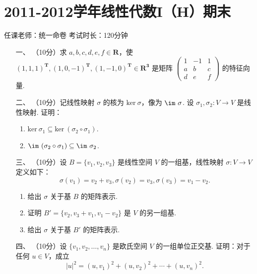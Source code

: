 \section*{2011-2012学年线性代数I（H）期末}

\begin{center}
    任课老师：统一命卷\hspace{4em} 考试时长：120分钟
\end{center}

\begin{enumerate}
    \item [一、]（10分）求 $a,b,c,d,e,f\in \mathbf{R}$，使 $(1,1,1)^\mathbf{T},(1,0,-1)^\mathbf{T},(1,-1,0)^\mathbf{T}\in \mathbf{R^3}$ 是矩阵 $\begin{pmatrix}1 & -1 & 1 \\ a & b & c \\ d & e & f\end{pmatrix}$ 的特征向量.

    \item [二、]（10分）记线性映射 $\sigma$ 的核为 $\mathrm{ker}\ \sigma$，像为 $\im\ \sigma$.  设 $\sigma_1,\sigma_2:V\to V$ 是线性映射. 证明：
    \begin{enumerate}[label=(\arabic*)]
        \item $\mathrm{ker}\ \sigma_1 \subseteq \mathrm{ker}\ (\sigma_2 \circ \sigma_1)$.

        \item $\im\ (\sigma_2 \circ \sigma_1) \subseteq \im\ \sigma_2$.
    \end{enumerate}

\item [三、]（10分）设 $B=\{v_1,v_2,v_3\}$ 是线性空间 $V$ 的一组基，线性映射 $\sigma:V\to V$ 定义如下：
    \[\sigma(v_1)=v_2+v_3,\sigma(v_2)=v_3,\sigma(v_3)=v_1-v_2.\]
    \begin{enumerate}[label=(\arabic*)]
        \item 给出 $\sigma$ 关于基 $B$ 的矩阵表示.

        \item 证明 $B'=\{v_2,v_3+v_1,v_1-v_2\}$ 是 $V$ 的另一组基.

        \item 给出 $\sigma$ 关于基 $B'$ 的矩阵表示.
    \end{enumerate}

\item [四、]（10分）设 $\{v_1,v_2,\ldots,v_n\}$ 是欧氏空间 $V$ 的一组单位正交基. 证明：对于任何 $u\in V$，成立
    \[\lvert u \rvert^2 = (u,v_1)^2+(u,v_2)^2+\cdots+(u,v_n)^2.\]


\end{enumerate}
